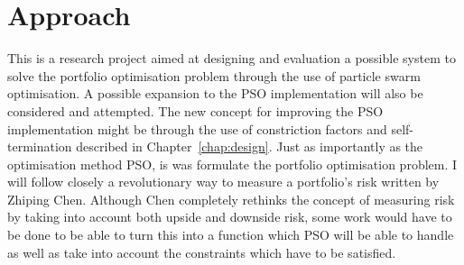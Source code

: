 
  \section{Approach} %
  \label{sec:approach}
  This is a research project aimed at designing and evaluation a possible system to solve the portfolio optimisation problem through the use of particle swarm optimisation. A possible expansion to the PSO implementation \cite{haskellPSO} will also be considered and attempted. The new concept for improving the PSO implementation might be through the use of constriction factors and self-termination described in Chapter~\ref{chap:design}. Just as importantly as the optimisation method PSO, is was formulate the portfolio optimisation problem. I will follow closely a revolutionary way to measure a portfolio's risk \cite{two_sided_risk} written by Zhiping Chen. Although Chen completely rethinks the concept of measuring risk by taking into account both upside and downside risk, some work would have to be done to be able to turn this into a function which PSO will be able to handle as well as take into account the constraints which have to be satisfied. 

